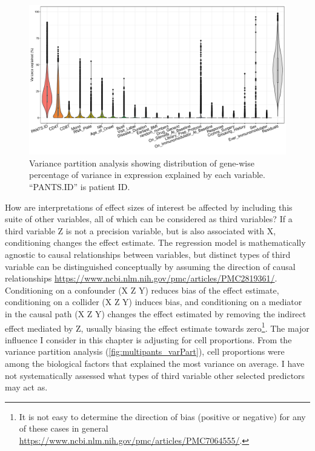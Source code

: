 \begin{figure}
    \centering
    \includegraphics[width=1.0\textwidth,page=1]{mainmatter/figures/chapter_04/dream.plotVarPart.pdf}
    \caption{Variance partition analysis showing distribution of gene-wise percentage of variance in expression explained by each variable. \enquote{PANTS.ID} is patient ID.}
    \label{fig:multipants_varPart}
\end{figure}

How are interpretations of effect sizes of interest be affected by including this suite of other variables, all of which can be considered as third variables?
If a third variable Z is not a precision variable, but is also associated with X, conditioning changes the effect estimate.
The regression model is mathematically agnostic to causal relationships between variables,
but distinct types of third variable can be distinguished conceptually by assuming the direction of causal relationships \url{https://www.ncbi.nlm.nih.gov/pmc/articles/PMC2819361/}.
Conditioning on a confounder (X \textleftarrow Z \textrightarrow Y) reduces bias of the effect estimate,
conditioning on a collider (X \textrightarrow Z \textleftarrow Y) induces bias,
and conditioning on a mediator in the causal path (X \textrightarrow Z \textrightarrow Y) changes the effect estimated by removing the indirect effect mediated by Z,
usually biasing the effect estimate towards zero\footnote{It is not easy to determine the direction of bias (positive or negative) for any of these cases in general \url{https://www.ncbi.nlm.nih.gov/pmc/articles/PMC7064555/}.}.
The major influence I consider in this chapter is adjusting for cell proportions.
From the variance partition analysis (\autoref{fig:multipants_varPart}), cell proportions were among the biological factors that explained the most variance on average.
I have not systematically assessed what types of third variable other selected predictors may act as.

